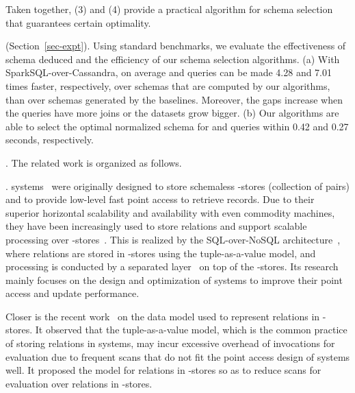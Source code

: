 Taken together, (3) and (4) provide a practical
  algorithm for schema selection that guarantees certain optimality.
  

 (Section~\ref{sec-expt}). 
Using standard benchmarks, we evaluate the effectiveness
of \baav schema deduced %
and the efficiency of
our schema selection algorithms.
(a) With SparkSQL-over-Cassandra, on average \tpch and \tpcds
queries can be made 4.28 and 7.01 times faster, respectively, over
\baav schemas that are computed by our algorithms,
than over schemas generated by the baselines. Moreover, the gaps
increase when the queries have more joins or the datasets grow bigger.
(b) Our algorithms are able to select
the optimal normalized \baav schema for \tpch and \tpcds
queries within 0.42 and 0.27 seconds, respectively.


\vspace{0.6ex}

. The related work is organized as follows.

.
\kv systems~\cite{AmazonKV, FacebookKV, cassandra, bigtable,
hbase, F1} were originally designed to store schemaless
\kv-stores (\ie collection of \kv pairs) and to provide low-level
fast point access to retrieve \kv records. Due to %
their
superior horizontal scalability and availability with even
commodity machines, they have been increasingly used to store
relations and support scalable \SQL processing over
\kv-stores~\cite{spanner1,spanner,myrocks}. This is realized by
the SQL-over-NoSQL architecture~\cite{kvscan}, where relations
are stored in \kv-stores using the tuple-as-a-value model, and
\SQL processing is conducted by a separated \SQL
layer~\cite{cassandra,hive,phoenix,sparksql,drill,impala,kudu} on
top of the \kv-stores. Its research mainly focuses on the design
and optimization of \kv systems to improve their point access and
update performance.

Closer %
is the recent work~\cite{VLDB19} on the data model used to
represent relations in \kv-stores. It observed that the
tuple-as-a-value model, which is the common practice of storing
relations in \kv systems, may incur excessive overhead of \get
invocations for \SQL evaluation due to %
frequent %
scans
that do not fit  the point access design of \kv systems well.
It proposed the \baav model for relations in \kv-stores so as to
reduce scans for \SQL evaluation over relations in \kv-stores.

